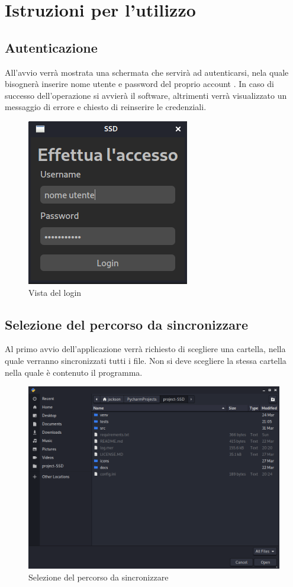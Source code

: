\section{Istruzioni per l'utilizzo}
\subsection{Autenticazione}
All'avvio verrà mostrata una schermata che servirà ad autenticarsi, nela quale bisognerà inserire nome utente e password del proprio account . In caso di successo dell'operazione si avvierà il software, altrimenti verrà visualizzato un messaggio di errore e chiesto di reinserire le credenziali.
\begin{figure}[H]
    \centering
    \includegraphics[scale = 0.50]{components/img/login.png}
    \caption{Vista del login}
    \label{fig:Vista del login}
\end{figure}
\subsection{Selezione del percorso da sincronizzare}
\label{sec:selezionepath}
Al primo avvio dell'applicazione verrà richiesto di scegliere una cartella, nella quale verranno sincronizzati tutti i file. Non si deve scegliere la stessa cartella nella quale è contenuto il programma.
\begin{figure}[H]
    \centering
    \includegraphics[scale = 0.30]{components/img/selezione-path.png}
    \caption{Selezione del percorso da sincronizzare}
    \label{fig:Selezione del percorso da sincronizzare}
\end{figure}

